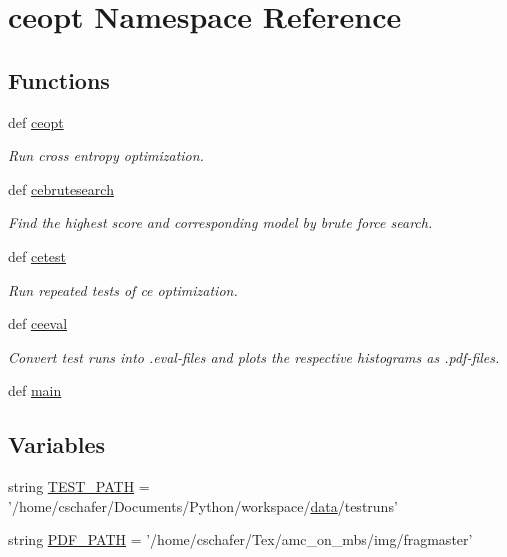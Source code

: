 \hypertarget{namespaceceopt}{
\section{ceopt Namespace Reference}
\label{namespaceceopt}
}
\subsection*{Functions}
\begin{CompactItemize}
\item 
def \hyperlink{namespaceceopt_7c618a38f2a7288326b5cd95efc4be86}{ceopt}
\begin{CompactList}\small\item\em Run cross entropy optimization. \item\end{CompactList}\item 
def \hyperlink{namespaceceopt_7e223ba50a9bfff0599dd2ec8a823ca3}{cebrutesearch}
\begin{CompactList}\small\item\em Find the highest score and corresponding model by brute force search. \item\end{CompactList}\item 
def \hyperlink{namespaceceopt_59ffe1ffe93974a9623cac3917f0c409}{cetest}
\begin{CompactList}\small\item\em Run repeated tests of ce optimization. \item\end{CompactList}\item 
def \hyperlink{namespaceceopt_221be49549179d59d8c5bfe30706ca2c}{ceeval}
\begin{CompactList}\small\item\em Convert test runs into .eval-files and plots the respective histograms as .pdf-files. \item\end{CompactList}\item 
def \hyperlink{namespaceceopt_070fc29c5e852338e3352b09633c4fd3}{main}
\end{CompactItemize}
\subsection*{Variables}
\begin{CompactItemize}
\item 
string \hyperlink{namespaceceopt_909c15e21c1762433b80d29c7a095bc9}{TEST\_\-PATH} = '/home/cschafer/Documents/Python/workspace/\hyperlink{classsampling_1_1data}{data}/testruns'
\item 
string \hyperlink{namespaceceopt_cbf36072c5792daee6740a457808e012}{PDF\_\-PATH} = '/home/cschafer/Tex/amc\_\-on\_\-mbs/img/fragmaster'
\end{CompactItemize}



